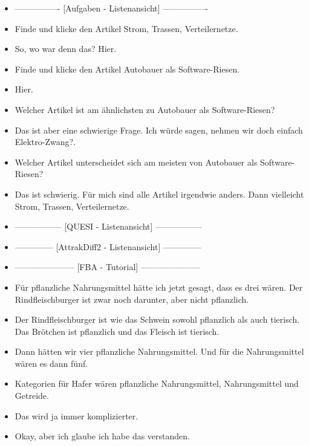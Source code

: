 {\begin{itemize}[]
              Die spielen im Thema E-Mobilität auch eine große Rolle, würde ich jetzt mal so behaupten.
        \item {----------------} [Aufgaben - Listenansicht] {----------------}
        \item {} Finde und klicke den Artikel \flqq Strom, Trassen, Verteilernetze\frqq{}.
        \item {} So, wo war denn das? Hier.
        \item {} Finde und klicke den Artikel \flqq Autobauer als Software-Riesen\frqq{}.
        \item {} Hier.
        \item {} Welcher Artikel ist am ähnlichsten zu \flqq Autobauer als Software-Riesen\frqq{}?
        \item {} Das ist aber eine schwierige Frage. Ich würde sagen, nehmen wir doch einfach \flqq Elektro-Zwang?\frqq{}.
        \item {} Welcher Artikel unterscheidet sich am meisten von \flqq Autobauer als Software-Riesen\frqq{}?
        \item {} Das ist schwierig. Für mich sind alle Artikel irgendwie anders. Dann vielleicht \flqq Strom, Trassen, Verteilernetze\frqq{}.
        \item {-----------------} [QUESI - Listenansicht] {-----------------}
        \item {--------------} [AttrakDiff2 - Listenansicht] {--------------}
        \item {---------------------} [FBA - Tutorial] {---------------------}
        \item {} Für pflanzliche Nahrungsmittel hätte ich jetzt gesagt, dass es drei wären.
              Der Rindfleischburger ist zwar noch darunter, aber nicht pflanzlich.
        \item {} Der Rindfleischburger ist wie das Schwein sowohl pflanzlich als auch tierisch. Das Brötchen ist pflanzlich und das Fleisch ist tierisch.
        \item {} Dann hätten wir vier pflanzliche Nahrungsmittel. Und für die Nahrungsmittel wären es dann fünf.
        \item {} Kategorien für Hafer wären pflanzliche Nahrungsmittel, Nahrungsmittel und Getreide.
        \item {} Das wird ja immer komplizierter.
        \item {} Okay, aber ich glaube ich habe das verstanden.

\end{itemize}}

